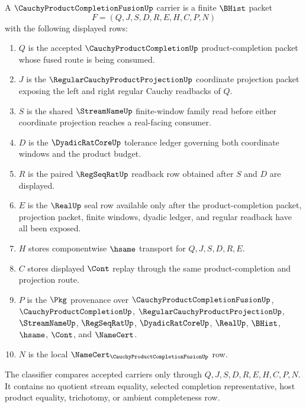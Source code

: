 \begin{definition}
\label{def:cauchy-product-completion-fusion-carrier}
A $\CauchyProductCompletionFusionUp$ carrier is a finite $\BHist$ packet
$$
F=(Q,J,S,D,R,E,H,C,P,N)
$$
with the following displayed rows:
\begin{enumerate}
\item $Q$ is the accepted $\CauchyProductCompletionUp$ product-completion
packet whose fused route is being consumed.
\item $J$ is the $\RegularCauchyProductProjectionUp$ coordinate projection
packet exposing the left and right regular Cauchy readbacks of $Q$.
\item $S$ is the shared $\StreamNameUp$ finite-window family read before either
coordinate projection reaches a real-facing consumer.
\item $D$ is the $\DyadicRatCoreUp$ tolerance ledger governing both coordinate
windows and the product budget.
\item $R$ is the paired $\RegSeqRatUp$ readback row obtained after $S$ and $D$
are displayed.
\item $E$ is the $\RealUp$ seal row available only after the product-completion
packet, projection packet, finite windows, dyadic ledger, and regular readback
have all been exposed.
\item $H$ stores componentwise $\hsame$ transport for $Q,J,S,D,R,E$.
\item $C$ stores displayed $\Cont$ replay through the same product-completion
and projection route.
\item $P$ is the $\Pkg$ provenance over $\CauchyProductCompletionFusionUp$,
$\CauchyProductCompletionUp$, $\RegularCauchyProductProjectionUp$,
$\StreamNameUp$, $\RegSeqRatUp$, $\DyadicRatCoreUp$, $\RealUp$, $\BHist$,
$\hsame$, $\Cont$, and $\NameCert$.
\item $N$ is the local $\NameCert_{\CauchyProductCompletionFusionUp}$ row.
\end{enumerate}
The classifier compares accepted carriers only through
$Q,J,S,D,R,E,H,C,P,N$. It contains no quotient stream equality, selected
completion representative, host product equality, trichotomy, or ambient
completeness row.
\end{definition}

